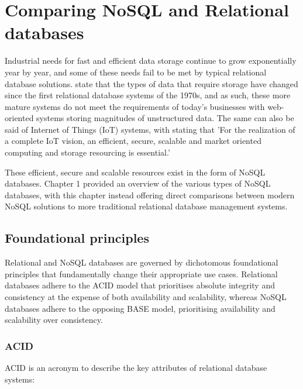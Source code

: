 \chapter{Comparing NoSQL and Relational databases} 



Industrial needs for fast and efficient data storage continue to grow exponentially year by year, and some of these needs fail to be met 
by typical relational database solutions. \textcite{corbelliniPersistingBigdataNoSQL2017} state that the types of data that require storage 
have changed since the first relational database systems of the 1970s, and as such, these more mature systems do not meet the requirements of
today's businesses with web-oriented systems storing magnitudes of unstructured data. The same can also be said of Internet of Things 
(IoT) systems, with  \textcite{gubbiInternetThingsIoT2013} stating that 'For the realization of a complete IoT vision, an efficient, secure,
scalable and market oriented computing and storage resourcing is essential.'

\para These efficient, secure and scalable resources exist in the form of NoSQL databases. Chapter 1 provided an overview of the various 
types of NoSQL databases, with this chapter instead offering direct comparisons between modern NoSQL solutions to more traditional relational 
database management systems.

\section{Foundational principles}
Relational and NoSQL databases are governed by dichotomous foundational principles that fundamentally change their appropriate use cases.
Relational databases adhere to the ACID model that prioritises absolute integrity and consistency at the expense of both availability and 
scalability, whereas NoSQL databases adhere to the opposing BASE model, prioritising availability and scalability over consistency.  

\subsection{ACID}
ACID is an acronym to describe the key attributes of relational database systems:

